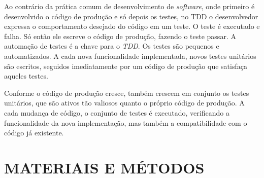 \documentclass[times, twoside, watermark]{artigo}
\begin{document}
Ao contrário da prática comum de desenvolvimento de \textit{software}, onde primeiro é desenvolvido o código de produção e só depois os testes, no TDD
o desenvolvedor expressa o comportamento desejado do código em um teste. 
O teste é executado e falha. Só então ele escreve o código de produção, fazendo o teste passar.
A automação de testes é a chave para o \textit{TDD}. Os testes são pequenos e automatizados.
A cada nova funcionalidade implementada, novos testes unitários são escritos, 
seguidos imediatamente por um código de produção que satisfaça aqueles testes. 

Conforme o código de produção cresce, também crescem em conjunto os testes unitários, 
que são ativos tão valiosos quanto o próprio código de produção. A cada mudança de código, o conjunto de testes é executado, verificando a funcionalidade da nova implementação, mas também a compatibilidade com o código já existente. \cite{tddembeddedc}

%



\section*{MATERIAIS E MÉTODOS}
\setcounter{section}{-1}

%
%
\end{document}
